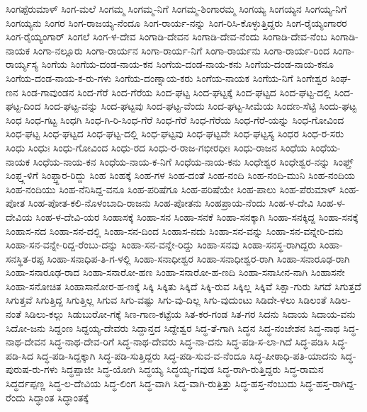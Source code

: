 ಸಿಂಗಪ್ಪೆರುಮಾಳ್
ಸಿಂಗ-ಮಲೆ
ಸಿಂಗಮ್ಮ
ಸಿಂಗಮ್ಮ-ನಿಗೆ
ಸಿಂಗಮ್ಮ-ಶಿಂಗಾರಮ್ಮ
ಸಿಂಗಯ್ಯ
ಸಿಂಗಯ್ಯನ
ಸಿಂಗಯ್ಯ-ನಿಗೆ
ಸಿಂಗಯ್ಯನು
ಸಿಂಗರ
ಸಿಂಗ-ರಾಜಯ್ಯ-ನೆಂದೂ
ಸಿಂಗ-ರಾರ್ಯ-ನನ್ನು
ಸಿಂಗ-ರಿಸಿ-ಕೊಳ್ಳುತ್ತಿದ್ದರು
ಸಿಂಗ-ರೈಯ್ಯಂಗಾರರ
ಸಿಂಗ-ರೈಯ್ಯಂಗಾರ್
ಸಿಂಗಲೆ
ಸಿಂಗ-ಳ-ದೇವ
ಸಿಂಗಾಡಿ-ದೇವನ
ಸಿಂಗಾಡಿ-ದೇವ-ನೆಂದು
ಸಿಂಗಾಡಿ-ದೇವ-ನೆಂಬ
ಸಿಂಗಾಡಿ-ನಾಯಕ
ಸಿಂಗಾ-ನಲ್ಲೂರು
ಸಿಂಗಾ-ರಾರ್ಯನ
ಸಿಂಗಾ-ರಾರ್ಯ-ನಿಗೆ
ಸಿಂಗಾ-ರಾರ್ಯನು
ಸಿಂಗಾ-ರಾರ್ಯ-ರಿಂದ
ಸಿಂಗಾ-ರಾರ್ಯ್ಯಸ್ಯ
ಸಿಂಗೆಯ
ಸಿಂಗೆಯ-ದಂಡ-ನಾಯ-ಕನ
ಸಿಂಗೆಯ-ದಂಡ-ನಾಯ-ಕನು
ಸಿಂಗೆಯ-ದಂಡ-ನಾಯ-ಕನೂ
ಸಿಂಗೆಯ-ದಂಡ-ನಾಯ-ಕ-ರು-ಗಳು
ಸಿಂಗೆಯ-ದಂಣ್ನಾಯ-ಕರು
ಸಿಂಗೆಯ-ನಾಯಕ
ಸಿಂಗೆಯ-ನಿಗೆ
ಸಿಂಗೇಶ್ವರ
ಸಿಂಘ-ಣನ
ಸಿಂಡ-ಗಾವುಂಡನ
ಸಿಂದ-ಗೆರೆ
ಸಿಂದ-ಗೆರೆಯ
ಸಿಂದ-ಘಟ್ಟ
ಸಿಂದ-ಘಟ್ಟಕ್ಕೆ
ಸಿಂದ-ಘಟ್ಟದ
ಸಿಂದ-ಘಟ್ಟ-ದಲ್ಲಿ
ಸಿಂದ-ಘಟ್ಟ-ದಿಂದ
ಸಿಂದ-ಘಟ್ಟ-ವನ್ನು
ಸಿಂದ-ಘಟ್ಟವು
ಸಿಂದ-ಘಟ್ಟ-ವೆಂದು
ಸಿಂದ-ಘಟ್ಟ-ಸೀಮೆಯ
ಸಿಂದಣ-ಸೆಟ್ಟಿ
ಸಿಂದು-ಘಟ್ಟ
ಸಿಂಧ
ಸಿಂಧ-ಗಟ್ಟ
ಸಿಂಧಗಿ
ಸಿಂಧ-ಗಿ-ರಿ-ಸಿಂಧ-ಗೆರೆ
ಸಿಂಧ-ಗೆರೆ
ಸಿಂಧ-ಗೆರೆಯ
ಸಿಂಧ-ಗೆರೆ-ಯನ್ನು
ಸಿಂಧ-ಗೋವಿಂದ
ಸಿಂಧ-ಘಟ್ಟ
ಸಿಂಧ-ಘಟ್ಟದ
ಸಿಂಧ-ಘಟ್ಟ-ದಲ್ಲಿ
ಸಿಂಧ-ಘಟ್ಟವು
ಸಿಂಧ-ಘಟ್ಟವೇ
ಸಿಂಧ-ಘಟ್ಟಸ್ಯ
ಸಿಂಧರ
ಸಿಂಧ-ರ-ಸರು
ಸಿಂಧು
ಸಿಂಧುಃ
ಸಿಂಧು-ಗೋವಿಂದ
ಸಿಂಧು-ರದ
ಸಿಂಧು-ರ-ರಾಜ-ಗಭೀರಧೀಃ
ಸಿಂಧು-ರಾಜನ
ಸಿಂಧೆಯ
ಸಿಂಧೆಯ-ನಾಯಕ
ಸಿಂಧೆಯ-ನಾಯ-ಕನ
ಸಿಂಧೆಯ-ನಾಯ-ಕ-ನಿಗೆ
ಸಿಂಧೆಯ-ನಾಯ-ಕನು
ಸಿಂಧೇಶ್ವರ
ಸಿಂಧೇಶ್ವರ-ನನ್ನು
ಸಿಂಫ್ತ್
ಸಿಂಫ್ತ್ಗ-ಳಿಗೆ
ಸಿಂಫ್ತ್ದಾರ-ರಿದ್ದು
ಸಿಂಹ
ಸಿಂಹಕ್ಕೆ
ಸಿಂಹ-ಗಳ
ಸಿಂಹ-ದಂತೆ
ಸಿಂಹ-ನಂದಿ
ಸಿಂಹ-ನಂದಿ-ಮುನಿ
ಸಿಂಹ-ನಂದಿಯ
ಸಿಂಹ-ನಂದಿಯು
ಸಿಂಹ-ನೆನಿಸಿದ್ದ-ವನೂ
ಸಿಂಹ-ಪರಿಷೆಗೂ
ಸಿಂಹ-ಪರಿಷೆಯೇ
ಸಿಂಹ-ಪಾಲು
ಸಿಂಹ-ಪೆರುಮಾಳ್
ಸಿಂಹ-ಪೋತ
ಸಿಂಹ-ಪೋತ-ಕಲಿ-ನೊಳಂಬಾದಿ-ರಾಜನು
ಸಿಂಹ-ಪೋತನು
ಸಿಂಹಪ್ರಾಯ-ನೆಂದು
ಸಿಂಹ-ಳ-ದೇವಿ
ಸಿಂಹ-ಳ-ದೇವಿಯ
ಸಿಂಹ-ಳ-ದೇವಿ-ಯರ
ಸಿಂಹಾಸಕ್ಕೆ
ಸಿಂಹಾ-ಸನ
ಸಿಂಹಾ-ಸನಕೆ
ಸಿಂಹಾ-ಸನಕ್ಕಾಗಿ
ಸಿಂಹಾ-ಸನಕ್ಕಿದ್ದ
ಸಿಂಹಾ-ಸನಕ್ಕೆ
ಸಿಂಹಾಸ-ನದ
ಸಿಂಹಾ-ಸನ-ದಲ್ಲಿ
ಸಿಂಹಾ-ಸನ-ದಿಂದ
ಸಿಂಹಾಸ-ನದು
ಸಿಂಹಾ-ಸನ-ವನ್ನು
ಸಿಂಹಾ-ಸನ-ವನ್ನೇರಿ-ದನು
ಸಿಂಹಾ-ಸನ-ವನ್ನೇ-ರಿದ್ದ-ರೆಂಬು-ದನ್ನು
ಸಿಂಹಾ-ಸನ-ವನ್ನೇ-ರಿದ್ದು
ಸಿಂಹಾ-ಸನವು
ಸಿಂಹಾ-ಸನಸ್ಥ-ರಾಗಿದ್ದರು
ಸಿಂಹಾ-ಸನಸ್ಥಿತ-ರಪ್ಪ
ಸಿಂಹಾ-ಸನಾಧಿಪ-ತಿ-ಗ-ಳಲ್ಲಿ
ಸಿಂಹಾ-ಸನಾಧೀಶ್ವರ
ಸಿಂಹಾ-ಸನಾಧೀಶ್ವರ-ರಾಗಿ
ಸಿಂಹಾ-ಸನಾರೂಢ-ರಾಗಿ
ಸಿಂಹಾ-ಸನಾರೂಢ-ರಾದ
ಸಿಂಹಾ-ಸನಾರೋ-ಹಣ
ಸಿಂಹಾ-ಸನಾರೋ-ಹ-ಣದಿ
ಸಿಂಹಾ-ಸನಾಸೀನ-ನಾಗಿ
ಸಿಂಹಾಸನೇ
ಸಿಂಹಾ-ಸನೋಚಿತ
ಸಿಂಹಾಸಾನೋರ-ಹ-ಣಕ್ಕೆ
ಸಿಕ್ಕಿ
ಸಿಕ್ಕಿತು
ಸಿಕ್ಕಿದೆ
ಸಿಕ್ಕಿ-ರುವ
ಸಿಕ್ಕಿಲ್ಲ
ಸಿಕ್ಕಿವೆ
ಸಿಕ್ಷಾ-ಗುರು
ಸಿಗದೆ
ಸಿಗುತ್ತದೆ
ಸಿಗುತ್ತವೆ
ಸಿಗುತ್ತಿದ್ದ
ಸಿಗುತ್ತಿಲ್ಲ
ಸಿಗುವ
ಸಿಗು-ವಷ್ಟು
ಸಿಗು-ವು-ದಿಲ್ಲ
ಸಿಗು-ವುದುಂಟು
ಸಿಡಿದೇ-ಳಲು
ಸಿಡಿಲಂತೆ
ಸಿಡಿಲ-ನಂತೆ
ಸಿಡಿಲು-ಕಲ್ಲು
ಸಿಡುಬುರೋ-ಗಕ್ಕೆ
ಸಿಣ-ಗಾಣ-ಕಟ್ಟೆಯ
ಸಿತ-ಕರ-ಗಂಡ
ಸಿತ-ಗರ
ಸಿದನು
ಸಿದಾಯ
ಸಿದಾಯ-ವನು
ಸಿದೋ-ಜನು
ಸಿದ್ದಂಣ
ಸಿದ್ದಯ್ಯ-ದೇವರು
ಸಿದ್ದಾನ್ತದ
ಸಿದ್ದೇಶ್ವರ
ಸಿದ್ಧ-ತೆ-ಗಾಗಿ
ಸಿದ್ಧನ
ಸಿದ್ಧ-ನಂಜೇಶನ
ಸಿದ್ಧ-ನಾಥ
ಸಿದ್ಧ-ನಾಥ-ದೇವನ
ಸಿದ್ಧ-ನಾಥ-ದೇವ-ರಿಗೆ
ಸಿದ್ಧ-ನಾಥ-ದೇವರು
ಸಿದ್ಧ-ನಾ-ದನು
ಸಿದ್ಧ-ಪಡಿ-ಸ-ಲಾ-ಗಿದೆ
ಸಿದ್ಧ-ಪಡಿಸಿ
ಸಿದ್ಧ-ಪಡಿ-ಸಿದ
ಸಿದ್ಧ-ಪಡಿ-ಸಿದ್ದಕ್ಕಾಗಿ
ಸಿದ್ಧ-ಪಡಿ-ಸುತ್ತಿದ್ದರು
ಸಿದ್ಧ-ಪಡಿ-ಸುವ-ವ-ನೆಂದೂ
ಸಿದ್ಧ-ಪೀಠಾಧಿ-ಪತಿ-ಯಾದನು
ಸಿದ್ಧ-ಪುರುಷ-ರು-ಗಳು
ಸಿದ್ಧಪ್ಪಾಜೀ
ಸಿದ್ಧ-ಯೋಗಿ
ಸಿದ್ಧಯ್ಯ
ಸಿದ್ಧಯ್ಯ-ಗವುಡ
ಸಿದ್ಧ-ರಾಗಿ-ರುತ್ತಿದ್ದರು
ಸಿದ್ಧ-ರಾಮನ
ಸಿದ್ಧರ್ದಪ್ಪಣ್ಣ
ಸಿದ್ಧ-ಲ-ದೇವಿಯ
ಸಿದ್ಧ-ಲಿಂಗ
ಸಿದ್ಧ-ವಾಗಿ
ಸಿದ್ಧ-ವಾಗಿ-ರುತ್ತಿತ್ತು
ಸಿದ್ಧ-ಹಸ್ತ-ನೆಂಬುದು
ಸಿದ್ಧ-ಹಸ್ತ-ರಾಗಿದ್ದ-ರೆಂದು
ಸಿದ್ಧಾಂತ
ಸಿದ್ಧಾಂತಕ್ಕೆ
